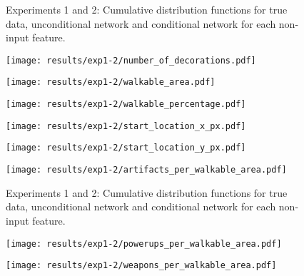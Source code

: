 \begin{figure}[ht]
	
	\caption[Graphical results for experiments 1 and 2]{Experiments 1 and 2: Cumulative distribution functions for true data, unconditional network and conditional network for each non-input feature.}
\end{figure}\begin{figure}[ht]
	\begin{minipage}[b]{0.45\linewidth}
		\centering
		\texttt{[image: results/exp1-2/number\_of\_decorations.pdf]} 
		\label{fig:results-noninput-number_of_decorations}
	\end{minipage}
	\begin{minipage}[b]{0.45\linewidth}
		\centering
		\texttt{[image: results/exp1-2/walkable\_area.pdf]} 
		\label{fig:results-noninput-walkable_area}
	\end{minipage} 
	
	
	\begin{minipage}[b]{0.45\linewidth}
		\centering
		\texttt{[image: results/exp1-2/walkable\_percentage.pdf]} 
		\label{fig:results-noninput-walkable_percentage}
	\end{minipage}
	\begin{minipage}[b]{0.45\linewidth}
		\centering
		\texttt{[image: results/exp1-2/start\_location\_x\_px.pdf]} 
		\label{fig:results-noninput-start_location_x_px}
	\end{minipage} 
	
	
	\begin{minipage}[b]{0.45\linewidth}
		\centering
		\texttt{[image: results/exp1-2/start\_location\_y\_px.pdf]} 
		\label{fig:results-noninput-start_location_y_px}
	\end{minipage}
	\begin{minipage}[b]{0.45\linewidth}
		\centering
		\texttt{[image: results/exp1-2/artifacts\_per\_walkable\_area.pdf]} 
		\label{fig:results-noninput-artifacts_per_walkable_area}
	\end{minipage} 
	
	
	\caption[Graphical results for experiments 1 and 2]{Experiments 1 and 2: Cumulative distribution functions for true data, unconditional network and conditional network for each non-input feature.}
\end{figure}\begin{figure}[ht]
	\begin{minipage}[b]{0.45\linewidth}
		\centering
		\texttt{[image: results/exp1-2/powerups\_per\_walkable\_area.pdf]} 
		\label{fig:results-noninput-powerups_per_walkable_area}
	\end{minipage}
	\begin{minipage}[b]{0.45\linewidth}
		\centering
		\texttt{[image: results/exp1-2/weapons\_per\_walkable\_area.pdf]} 
		\label{fig:results-noninput-weapons_per_walkable_area}
	\end{minipage} 
	

\end{figure}
